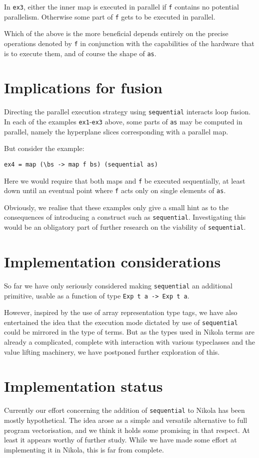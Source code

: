 In \texttt{ex3}, either the inner map is executed in parallel if \texttt{f}
contains no potential parallelism. Otherwise some part of \texttt{f} gets to be
executed in parallel.

Which of the above is the more beneficial depends entirely on the precise
operations denoted by \texttt{f} in conjunction with the capabilities of the
hardware that is to execute them, and of course the shape of \texttt{as}.

\section{Implications for fusion}

Directing the parallel execution strategy using \texttt{sequential} interacts
loop fusion.  In each of the examples \texttt{ex1}-\texttt{ex3} above, some
parts of \texttt{as} may be computed in parallel, namely the hyperplane slices
corresponding with a parallel map.

But consider the example:
\begin{verbatim}
ex4 = map (\bs -> map f bs) (sequential as)
\end{verbatim}

Here we would require that both maps and \texttt{f} be executed sequentially,
at least down until an eventual point where \texttt{f} acts only on single
elements of \texttt{as}.

Obviously, we realise that these examples only give a small hint as to the
consequences of introducing a construct such as \texttt{sequential}.
Investigating this would be an obligatory part of further research on the
viability of \texttt{sequential}.

\section{Implementation considerations}

So far we have only seriously considered making \texttt{sequential} an
additional primitive, usable as a function of type \texttt{Exp t a -> Exp t a}.

However, inspired by the use of array representation type tags, we have also
entertained the idea that the execution mode dictated by use of
\texttt{sequential} could be mirrored in the type of terms. But as the types
used in Nikola terms are already a complicated, complete with interaction with
various typeclasses and the value lifting machinery, we have postponed further
exploration of this.

\section{Implementation status}

Currently our effort concerning the addition of \texttt{sequential} to Nikola
has been mostly hypothetical. The idea arose as a simple and versatile
alternative to full program vectorisation, and we think it holds some promising
in that respect. At least it appears worthy of further study.  While we have
made some effort at implementing it in Nikola, this is far from complete.
